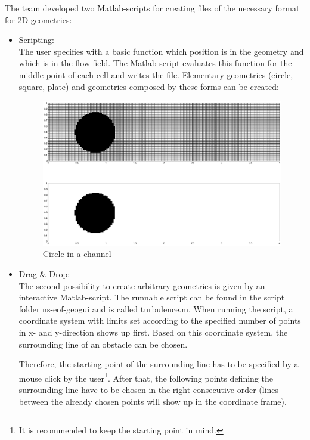 \noii The team developed two Matlab-scripts for creating files of the necessary format for 2D geometries:
\begin{itemize}
\item \underline{Scripting}:\\
The user specifies with a basic function which position is in the geometry and which is in the flow field. The Matlab-script evaluates this function for the middle point of each cell and writes the file. Elementary geometries (circle, square, plate) and geometries composed by these forms can be created:

\begin{figure}[!htb]
\centering
\includegraphics[scale=.3]{FIGURES/circle.eps}
\caption{Circle in a channel}
\label{fig:circle_in_channel}
\end{figure} 

\item \underline{Drag \& Drop}:\\
The second possibility to create arbitrary geometries is given by an interactive Matlab-script. The runnable script can be found in the script folder ns-eof-geogui and is called turbulence.m.
When running the script, a coordinate system with limits set according to the specified number of points in x- and y-direction shows up first. Based on this coordinate system, the surrounding line of an obstacle can be chosen.

Therefore, the starting point of the surrounding line has to be specified by a mouse click by the user\footnote{ It is recommended to keep the starting point in mind.}.
After that, the following points defining the surrounding line have to be chosen in the right consecutive order (lines between the already chosen points will show up in the coordinate frame).


\end{itemize}
